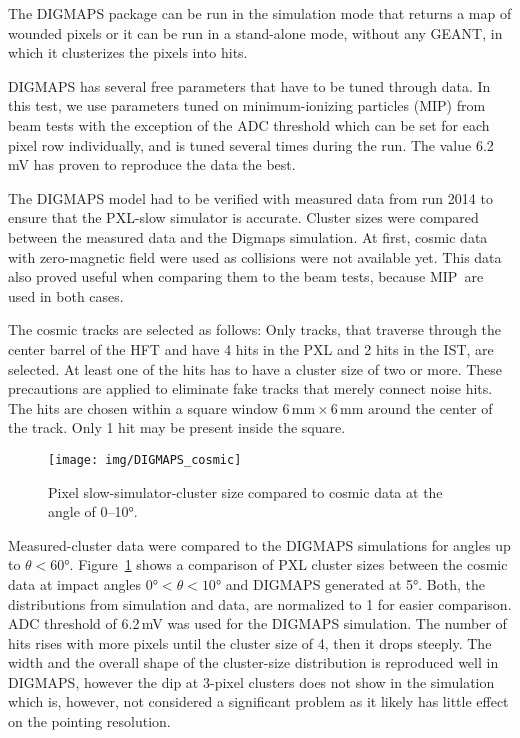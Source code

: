 The DIGMAPS package can be run in the simulation mode that returns a map of wounded pixels or it can be run in a stand-alone mode, without any GEANT, in which it clusterizes the pixels into hits.

DIGMAPS has several free parameters that have to be tuned through data. In this test, we use parameters tuned on minimum-ionizing particles (MIP) from beam tests with the exception of the ADC threshold which can be set for each pixel row individually, and is tuned several times during the run. The value 6.2$\,$mV has proven to reproduce the data the best.
 
The DIGMAPS model had to be verified with measured data from run 2014 to ensure that the PXL-slow simulator is accurate. Cluster sizes were compared between the measured data and the Digmaps simulation. At first, cosmic data with zero-magnetic field were used as collisions were not available yet. This data also proved useful when comparing them to the beam tests, because MIP\ are used in both cases.


The cosmic tracks are selected as follows: Only tracks, that traverse through the center barrel of the HFT and have 4 hits in the PXL and 2 hits in the IST, are selected. At least one of the hits has to have a cluster size of two or more. These precautions are applied to eliminate fake tracks that merely connect noise hits. The hits are chosen within a square window $6\,\mathrm{mm}\times6\,\mathrm{mm}$ around the center of the track. Only 1 hit may be present inside the square.


\begin{figure}[!htb]
\begin{center}
 \texttt{[image: img/DIGMAPS\_cosmic]}\\
\end{center}
\caption{\label{cosmicDigmaps}Pixel slow-simulator-cluster size compared to cosmic data at the angle of 0--10°.}
\end{figure}

Measured-cluster data were compared to the DIGMAPS simulations for angles up to $\theta < 60$°. Figure~\ref{cosmicDigmaps} shows a comparison of PXL cluster sizes between the cosmic data at impact angles $0\text{°} < \theta < 10$° and DIGMAPS generated at 5°\@. Both, the distributions from simulation and data, are normalized to 1 for easier comparison.  ADC threshold of 6.2$\,$mV was used for the DIGMAPS simulation. The number of hits rises with more pixels until the cluster size of 4, then it drops steeply. The width and the overall shape of the cluster-size distribution is reproduced well in DIGMAPS, however the dip at 3-pixel clusters does not show in the simulation which is, however, not considered a significant problem as it likely has little effect on the pointing resolution.

